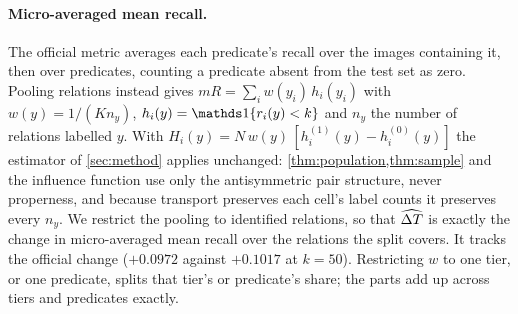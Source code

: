 \begin{table}[h]
\centering\footnotesize
\caption{Official evaluator against the offline replay. The official TDE row is this run's
evaluation; the official baseline row is the archived evaluation of the same checkpoint.}
\label{tab:recall-validation}

\end{table}

\paragraph{Micro-averaged mean recall.} The official metric averages each predicate's recall
over the images containing it, then over predicates, counting a predicate absent from the
test set as zero. Pooling relations instead gives
$mR=\sum_iw(y_i)\,h_i(y_i)$ with $w(y)=1/(K n_y)$, $h_i(y)=\ind\{r_i(y)<k\}$ and $n_y$ the
number of relations labelled $y$. With
$H_i(y)=N\,w(y)\,[h^{(1)}_i(y)-h^{(0)}_i(y)]$ the estimator of \cref{sec:method} applies
unchanged: \cref{thm:population,thm:sample} and the influence function use only the
antisymmetric pair structure, never properness, and because transport preserves each cell's
label counts it preserves every $n_y$. We restrict the pooling to identified relations, so
that $\widehat{\Delta T}$ is exactly the change in micro-averaged mean recall over the relations the split
covers. It tracks the official change ($+0.0972$ against $+0.1017$ at $k=50$). Restricting
$w$ to one tier, or one predicate, splits that tier's or predicate's share; the parts add up
across tiers and predicates exactly.

\begin{table}[t]
\centering\footnotesize
\caption{Mean-recall split for every protocol and $k$. LA$_\tau$: logit-adjusted baseline;
ctx, vis+ctx: the baseline's context branch alone and without the frequency branch.}
\label{tab:recall-split}

\end{table}

\begin{table}[t]
\centering\footnotesize
\caption{The $mR@50$ split by tier (training instances: head $>10{,}000$, tail $<500$).}
\label{tab:recall-tiers}

\end{table}

\begin{table}[t]
\centering\footnotesize
\caption{Within-cell AUC (comparison-weighted), image bootstrap with $1{,}000$ replicates.}
\label{tab:recall-auc}

\end{table}

